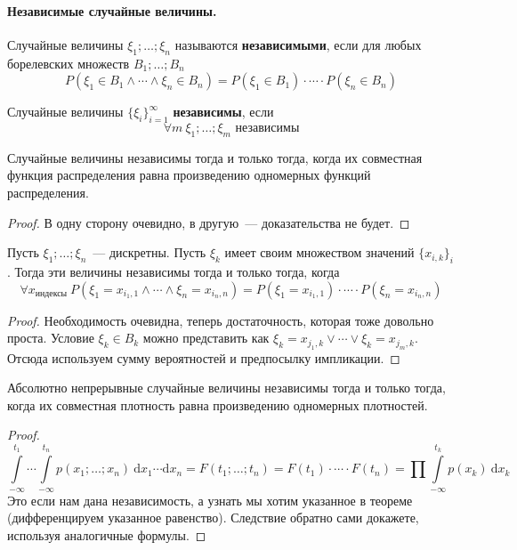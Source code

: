 \documentclass{article}
\begin{document}
    \paragraph{Независимые случайные величины.}
    \begin{definition}
        Случайные величины $\xi_1;\ldots;\xi_n$ называются \textbf{независимыми}, если для любых борелевских множеств $B_1;\ldots;B_n$
        $$
        P(\xi_1\in B_1\land\cdots\land\xi_n\in B_n)=P(\xi_1\in B_1)\cdot\cdots\cdot P(\xi_n\in B_n)
        $$
    \end{definition}
    \begin{definition}
        Случайные величины $\{\xi_i\}_{i=1}^\infty$ \textbf{независимы}, если
        $$
        \forall m~\xi_1;\ldots;\xi_m\text{ независимы}
        $$
    \end{definition}
    \begin{theorem}
        Случайные величины независимы тогда и только тогда, когда их совместная функция распределения равна произведению одномерных функций распределения.
    \end{theorem}
    \begin{proof}
        В одну сторону очевидно, в другую~--- доказательства не будет.
    \end{proof}
    \begin{theorem}
        Пусть $\xi_1;\ldots;\xi_n$~--- дискретны. Пусть $\xi_k$ имеет своим множеством значений $\{x_{i,k}\}_i$. Тогда эти величины независимы тогда и только тогда, когда
        $$
        \forall x_{\text{индексы}}~
        P(\xi_1=x_{i_1,1}\land\cdots\land\xi_n=x_{i_n,n})=P(\xi_1=x_{i_1,1})\cdot\cdots\cdot P(\xi_n=x_{i_n,n})
        $$
    \end{theorem}
    \begin{proof}
        Необходимость очевидна, теперь достаточность, которая тоже довольно проста. Условие $\xi_k\in B_k$ можно представить как $\xi_k=x_{j_1,k}\lor\cdots\lor \xi_k=x_{j_m,k}$. Отсюда используем сумму вероятностей и предпосылку импликации.
    \end{proof}
    \begin{theorem}
        Абсолютно непрерывные случайные величины независимы тогда и только тогда, когда их совместная плотность равна произведению одномерных плотностей.
    \end{theorem}
    \begin{proof}
        $$
        \int\limits_{-\infty}^{t_1}\cdots\int\limits_{-\infty}^{t_n}p(x_1;\ldots;x_n)~\mathrm dx_1\cdots\mathrm dx_n=F(t_1;\ldots;t_n)=F(t_1)\cdot\cdots\cdot F(t_n)=\prod\int\limits_{-\infty}^{t_k}p(x_k)~\mathrm dx_k
        $$
        Это если нам дана независимость, а узнать мы хотим указанное в теореме (дифференцируем указанное равенство). Следствие обратно сами докажете, используя аналогичные формулы.
    \end{proof}
\end{document}
